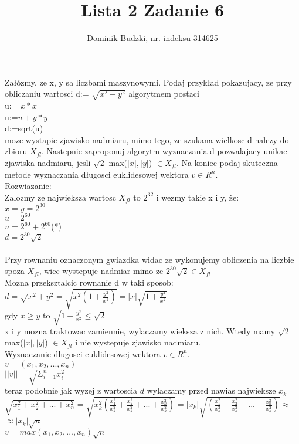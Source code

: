 \documentclass{article}
\title{Lista 2 Zadanie 6}
\author{Dominik Budzki, nr. indeksu 314625}
\begin{document}
    \maketitle

Załózmy, ze x, y sa liczbami maszynowymi. Podaj przykład pokazujacy, ze przy obliczaniu wartosci
d:= $\sqrt{x^2 + y^2}$
algorytmem postaci\\
u:= $x*x$\\
u:=$u+y*y$\\
d:=sqrt(u)\\
moze wystapic zjawisko nadmiaru, mimo tego, ze szukana wielkosc d nalezy do zbioru
$X_{fl}$. Nastepnie zaproponuj algorytm wyznaczania d pozwalajacy unikac zjawiska nadmiaru,
jesli $\sqrt{2}$ max($|x|, |y|$) $\in X_{fl}$. Na koniec podaj skuteczna metode wyznaczania
długosci euklidesowej wektora $v \in R^n$.\\

Rozwiazanie:\\
Zalozmy ze najwieksza wartosc $X_{fl}$ to $2^{32}$ i wezmy takie x i y, że:\\
$x = y = 2^{30}$\\
$u = 2^{60}$\\
$u = 2^{60} + 2^{60}$(*)\\
$d = 2^{30}\sqrt{2}$\\
\\
Przy rownaniu oznaczonym gwiazdka widac ze wykonujemy obliczenia na liczbie spoza $X_{fl}$, wiec wystepuje nadmiar mimo ze $2^{30}\sqrt{2} \in X_{fl}$
\\

Mozna przeksztalcic rownanie d w taki sposob:\\
$d = \sqrt{x^2 + y^2} = \sqrt{x^2(1+\frac{y^2}{x^2})} = |x|\sqrt{1+\frac{y^2}{x^2}}$\\
gdy $x \geq y$ to $\sqrt{1+\frac{y^2}{x^2}} \leq \sqrt{2}$\\
x i y mozna traktowac zamiennie, wylaczamy wieksza z nich. Wtedy mamy $\sqrt{2}$ max($|x|, |y|$) $\in X_{fl}$ i nie wystepuje zjawisko nadmiaru.\\

Wyznaczanie dlugosci euklidesowej wektora $v \in R^n$.\\
$v = (x_1, x_2, ..., x_n)$\\
$||v|| = \sqrt{\Sigma_{i=1}^n x_i^2}$\\
teraz podobnie jak wyzej z wartoscia $d$ wylaczamy przed nawias najwieksze $x_k$
$\sqrt{x_1^2+x_2^2+...+x_n^2} = \sqrt{x_k^2(\frac{x_1^2}{x_k^2}+\frac{x_2^2}{x_k^2}+...+\frac{x_n^2}{x_k^2})} = |x_k|\sqrt{(\frac{x_1^2}{x_k^2}+\frac{x_2^2}{x_k^2}+...+\frac{x_n^2}{x_k^2})} \approx $\\
$ \approx |x_k|\sqrt{n}$\\
$ v = max(x_1, x_2, ..., x_n)\sqrt{n}$\\
\end{document}
